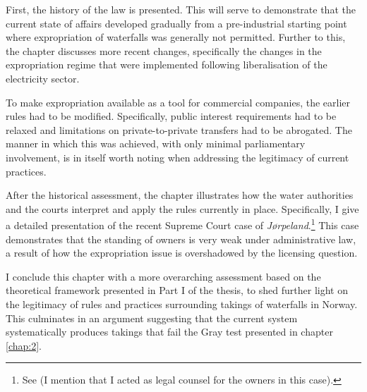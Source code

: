 First, the history of the law is presented. This will serve to demonstrate that the current state of affairs developed gradually from a pre-industrial starting point where expropriation of waterfalls was generally not permitted. Further to this, the chapter discusses more recent changes, specifically the changes in the expropriation regime that were implemented following liberalisation of the electricity sector.

To make expropriation available as a tool for commercial companies, the earlier rules had to be modified. Specifically, public interest requirements had to be relaxed and limitations on private-to-private transfers had to be abrogated. The manner in which this was achieved, with only minimal parliamentary involvement, is in itself worth noting when addressing the legitimacy of current practices.

After the historical assessment, the chapter illustrates how the water authorities and the courts interpret and apply the rules currently in place. Specifically, I give a detailed presentation of the recent Supreme Court case of {\it Jørpeland}.\footnote{See \cite{jorpeland11} (I mention that I acted as legal counsel for the owners in this case).} This case demonstrates that the standing of owners is very weak under administrative law, a result of how the expropriation issue is overshadowed by the licensing question.


I conclude this chapter with a more overarching assessment based on the theoretical framework presented in Part I of the thesis, to shed further light on the legitimacy of rules and practices surrounding takings of waterfalls in Norway. This culminates in an argument suggesting that the current system systematically produces takings that fail the Gray test presented in chapter \ref{chap:2}. %

